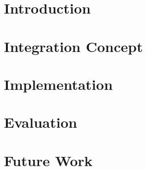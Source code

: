 \chapter{Introduction}


\chapter{Integration Concept}


\chapter{Implementation}


\chapter{Evaluation}


\chapter{Future Work}


\nocite{*}
